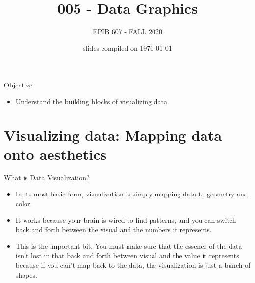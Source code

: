 \documentclass[10pt]{beamer}\usepackage[]{graphicx}\usepackage[]{color}
\begin{document}
	
	
	
	
	\title{005 - Data Graphics}
	\author{EPIB 607 - FALL 2020}
	
	\date{slides compiled on \today}
	
	\maketitle
	
	\begin{frame}{Objective}
	\begin{itemize}
		\item Understand the building blocks of visualizing data
	\end{itemize}
	\end{frame}
	
	\section{Visualizing data: Mapping data onto aesthetics}
	
		\begin{frame}{What is Data Visualization?}
		\begin{itemize}
			\item In its most basic form, visualization is simply mapping data to geometry and color. 
			\item It works because your brain is wired to find patterns, and you can switch back and forth between the visual and the numbers it represents. 
			\item This is the important bit. You must make sure that the essence of the data isn't lost in that back and forth between visual and the value it represents because if you can't map back to the data, the visualization is just a bunch of shapes.
		\end{itemize}
	\end{frame}
	
\end{document}
